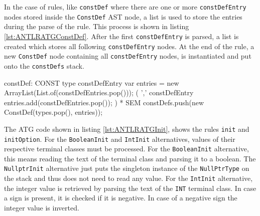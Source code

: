In the case of rules, like \verb|constDef| where there are one or more \verb|constDefEntry| nodes stored inside the \verb|ConstDef| AST node, a list is used to store the entries during the parse of the rule. This process is shown in listing \ref{lst:ANTLRATGConstDef}. After the first \verb|constDefEntry| is parsed, a list is created which stores all following \verb|constDefEntry| nodes.
At the end of the rule, a new \verb|ConstDef| node containing all \verb|constDefEntry| nodes, is instantiated and put onto the \verb|constDefs| stack.



\begin{AntlrCode}[float,numbers=none,caption=ATG for the \texttt{constDef} rule., label=lst:ANTLRATGConstDef]
constDef:    
    CONST type constDefEntry          
        { var entries = new ArrayList(List.of(constDefEntries.pop())); }
    (
        ',' constDefEntry           
        { entries.add(constDefEntries.pop());}
    )   * SEM
        { constDefs.push(new ConstDef(types.pop(), entries)); }
\end{AntlrCode}


The ATG code shown in listing \ref{lst:ANTLRATGInit}, shows the rules \verb|init| and \verb|initOption|. For the \verb|BooleanInit| and \verb|IntInit| alternatives, values of their respective terminal classes must be processed. For the \verb|BooleanInit| alternative, this means reading the text of the terminal class and parsing it to a boolean. The \verb|NullptrInit| alternative just puts the singleton instance of the \verb|NullPtrType| on the stack and thus does not need to read any value. For the \verb|IntInit| alternative, the integer value is retrieved by parsing the text of the \verb|INT| terminal class. In case a sign is present, it is checked if it is negative. In case of a negative sign the integer value is inverted. 



